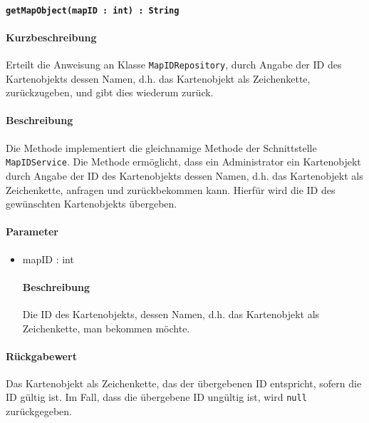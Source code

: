 \paragraph{\texttt{getMapObject(mapID : int) : String}}%
\paragraph*{Kurzbeschreibung}
Erteilt die Anweisung an Klasse \texttt{MapIDRepository}, durch Angabe der ID des Kartenobjekts dessen Namen, d.h. das Kartenobjekt als Zeichenkette, zurückzugeben, und gibt dies wiederum zurück.
\paragraph*{Beschreibung}
Die Methode implementiert die gleichnamige Methode der Schnittstelle \texttt{MapIDService}.
Die Methode ermöglicht, dass ein Administrator ein Kartenobjekt durch Angabe der ID des Kartenobjekts dessen Namen, d.h. das Kartenobjekt als Zeichenkette, anfragen und zurückbekommen kann.
Hierfür wird die ID des gewünschten Kartenobjekts übergeben.
\paragraph*{Parameter}
\begin{itemize}
    \item mapID : int
    		\paragraph*{Beschreibung}
    		Die ID des Kartenobjekts, dessen Namen, d.h. das Kartenobjekt als Zeichenkette, man bekommen möchte.
\end{itemize}
\paragraph*{Rückgabewert}
Das Kartenobjekt als Zeichenkette, das der übergebenen ID entspricht, sofern die ID gültig ist.
Im Fall, dass die übergebene ID ungültig ist, wird \texttt{null} zurückgegeben.
